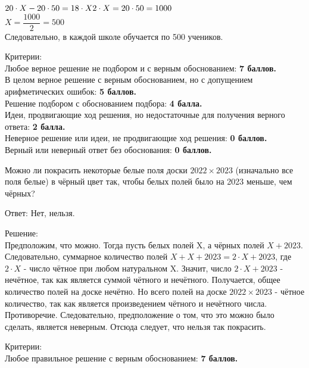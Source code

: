 \noindent
$20\cdot X - 20\cdot50 = 18\cdot X\\
2\cdot X = 20\cdot50 = 1000$\\

\noindent$X = \dfrac{1000}{2} = 500$\\
Следовательно, в каждой школе обучается по 500 учеников.

\hspace{3mm}

Критерии:\\
Любое верное решение не подбором и с верным обоснованием: \textbf{7 баллов.}\\
В целом верное решение с верным обоснованием, но с допущением арифметических ошибок: \textbf{5 баллов.}\\
Решение подбором с обоснованием подбора: \textbf{4 балла.}\\
Идеи, продвигающие ход решения, но недостаточные для получения верного ответа: \textbf{2 балла.}\\
Неверное решение или идеи, не продвигающие ход решения: \textbf{0 баллов.} \\
Верный или неверный ответ без обоснования: \textbf{0 баллов.}

\hspace{3mm}


Можно ли покрасить некоторые белые поля доски $2022\times2023$ (изначально все поля белые) в чёрный цвет так, чтобы белых полей было на 2023 меньше, чем чёрных?

\hspace{3mm}

Ответ: Нет, нельзя.

Решение:\\
Предположим, что можно. Тогда пусть белых полей X, а чёрных полей $X + 2023$. Следовательно, суммарное количество полей $X + X + 2023 = 2\cdot X + 2023$, 
где $2\cdot X$ - число чётное при любом натуральном X. 
Значит, число $2\cdot X + 2023$ - нечётное, так как является суммой чётного и нечётного. Получается, общее количество полей на доске нечётно. Но всего полей на доске $2022\times2023$ - чётное количество, так как является произведением чётного и нечётного числа. Противоречие. Следовательно, предположение о том, что это можно было сделать, является неверным. Отсюда следует, что нельзя так покрасить. 

\hspace{3mm}

Критерии:\\
Любое правильное решение с верным обоснованием: \textbf{7 баллов.}\\

